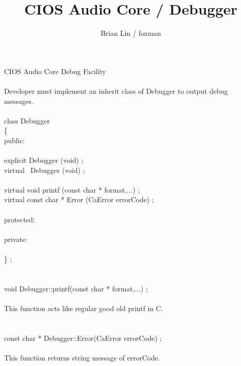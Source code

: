 \documentclass[UTF8]{ctexart}
\title{CIOS Audio Core / Debugger}
\author{Brian Lin / foxman}
\begin{document}
\maketitle
CIOS Audio Core Debug Facility\\
\\
Developer must implement an inherit class of Debugger to output debug messages.\\
\\
class Debugger\\
\{
\\
  public:\\
\\
    explicit             Debugger (void) ;\\
    virtual             ~Debugger (void) ;\\
\\
    virtual void         printf   (const char * format,...) ;\\
    virtual const char * Error    (CaError errorCode) ;\\
\\
  protected:\\
\\
  private:\\
\\
\}
;\\
\\
\\
void Debugger::printf(const char * format,...) ;\\
\\
This function acts like regular good old printf in C.\\
\\
\\
const char * Debugger::Error(CaError errorCode) ;\\
\\
This function returns string message of errorCode.\\
\\
\end{document}

